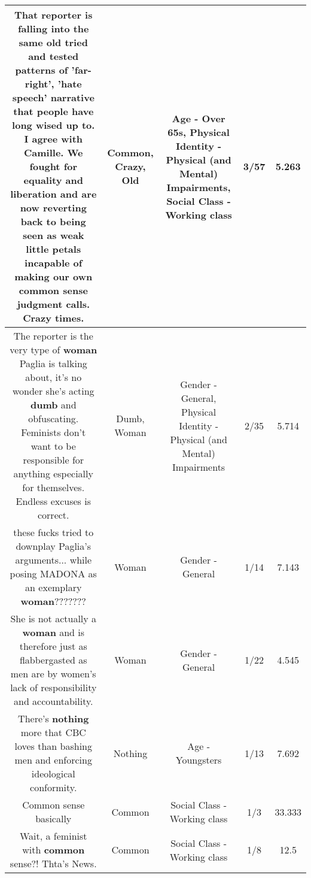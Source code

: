 \documentclass[11pt]{article}
\newlength\mylength
\begin{document}
\begin{center}
\begin{longtable}{|C{.65\mylength}|C{.30\mylength}|C{.12\mylength}|C{.12\mylength}|C{.12\mylength}|}
  \small That reporter is falling into the same \textbf{old} tried and tested patterns of 'far-right', 'hate speech' narrative that people have long wised up to. I agree with Camille. We fought for equality and liberation and are now reverting back to being seen as weak little petals incapable of making our own \textbf{common} sense judgment calls. \textbf{Crazy} times.\normalsize   & Common, Crazy, Old & Age - Over 65s, Physical Identity - Physical (and Mental) Impairments, Social Class - Working class & 3/57 & 5.263 \\  \hline
  \small The reporter is the very type of \textbf{woman} Paglia is talking about, it's no wonder she's acting \textbf{dumb} and obfuscating. Feminists don't want to be responsible for anything especially for themselves. Endless excuses is correct.\normalsize   & Dumb, Woman & Gender - General, Physical Identity - Physical (and Mental) Impairments & 2/35 & 5.714 \\  \hline
  \small these fucks tried to downplay Paglia's arguments... while posing MADONA as an exemplary \textbf{woman}???????\normalsize   & Woman & Gender - General & 1/14 & 7.143 \\  \hline
  \small She is not actually a \textbf{woman} and is therefore just as flabbergasted as men are by women's lack of responsibility and accountability.\normalsize   & Woman & Gender - General & 1/22 & 4.545 \\  \hline
  \small There's \textbf{nothing} more that CBC loves than bashing men and enforcing ideological conformity.\normalsize   & Nothing & Age - Youngsters & 1/13 & 7.692 \\  \hline
  \small Common sense basically\normalsize   & Common & Social Class - Working class & 1/3 & 33.333 \\  \hline
  \small Wait, a feminist with \textbf{common} sense?! Thta's News.\normalsize   & Common & Social Class - Working class & 1/8 & 12.5 \\  \hline

\end{longtable}
\end{center}
\end{document}
